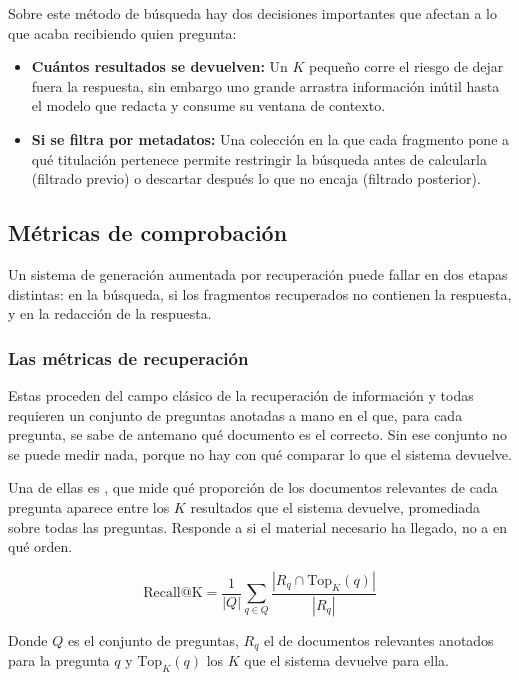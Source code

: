 Sobre este método de búsqueda hay dos decisiones importantes que afectan a lo que acaba recibiendo quien pregunta:

\begin{itemize}
  \item \textbf{Cuántos resultados se devuelven: } Un $K$ pequeño corre el riesgo de dejar fuera la respuesta, sin embargo uno grande arrastra información inútil hasta el modelo que redacta y consume su ventana de contexto.
  \item \textbf{Si se filtra por metadatos: } Una colección en la que cada fragmento pone a qué titulación pertenece permite restringir la búsqueda antes de calcularla (filtrado previo) o descartar después lo que no encaja (filtrado posterior). 
\end{itemize}


\subsection{Métricas de comprobación}


Un sistema de generación aumentada por recuperación puede fallar en dos etapas distintas: en la búsqueda, si los fragmentos recuperados no contienen la respuesta, y en la redacción de la respuesta.

\subsubsection{Las métricas de recuperación}

Estas proceden del campo clásico de la recuperación de información\cite{jurafsky2026slp3} y todas requieren un conjunto de preguntas anotadas a mano en el que, para cada pregunta, se sabe de antemano qué documento es el correcto. Sin ese conjunto no se puede medir nada, porque no hay con qué comparar lo que el sistema devuelve.

Una de ellas es , que mide qué proporción de los
  documentos relevantes de cada pregunta aparece entre los $K$ resultados que el sistema
  devuelve, promediada sobre todas las preguntas. Responde a si el material necesario ha llegado, no a en qué orden.

\begin{equation}
  \text{Recall@K} = \frac{1}{|Q|} \sum_{q \in Q} \frac{|R_q \cap \text{Top}_K(q)|}{|R_q|}
  \label{eq:recall_at_k}
\end{equation}

Donde $Q$ es el conjunto de preguntas, $R_q$ el de documentos relevantes
  anotados para la pregunta $q$ y $\text{Top}_K(q)$ los $K$ que el sistema devuelve para ella.

